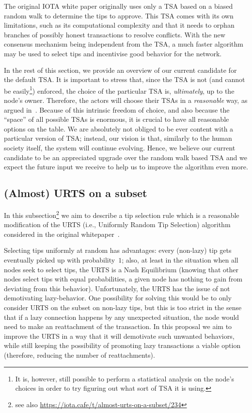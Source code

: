 \documentclass[../main.tex]{subfiles}
\begin{document}
The original IOTA white paper originally uses only a TSA based on a biased random walk to determine the tips to approve. This TSA comes with its own limitations, such as its computational complexity and that it needs to orphan branches of possibly honest transactions to resolve conflicts. With the new consensus mechanism being independent from the TSA, a much faster algorithm may be used to select tips and incentivise good behavior for the network. 


In the rest of this section, we provide an overview of our
current candidate for the default TSA.
It is important to stress that, since the TSA is not (and cannot 
be easily\footnote{It is, however, still possible to perform 
a statistical analysis on the node's choices in order to
try figuring out what sort of TSA it is using.}) 
enforced, the choice of the particular TSA 
is, \emph{ultimately}, 
up to the node's owner. Therefore, the actors 
will choose their TSAs in a \emph{reasonable} way, as argued in~\cite{popov2019feelessfree}. 
Because of this intrinsic freedom of choice, and also because the ``space'' of all possible TSAs is enormous, it is crucial to have all reasonable options on the table. We are absolutely not obliged to be ever content with a particular version of TSA; instead, our vision is that, similarly to the human society itself, the system will continue evolving. Hence, we believe our current candidate to be an appreciated upgrade over the random walk based TSA and we expect the future input we receive to help us to improve the algorithm even more.

\subsection{(Almost) URTS on a subset}\label{sec:tsa_urts}
In this subsection\footnote{see also
\url{https://iota.cafe/t/almost-urts-on-a-subset/234}}
we aim to describe a tip selection
rule which is a reasonable modification of the URTS
(i.e., Uniformly Random Tip Selection) algorithm
considered in the original whitepaper~\cite{popov2018}. 


Selecting tips uniformly at random has advantages:
every (non-lazy) tip gets eventually picked up with probability~$1$;
also, at least in the situation when all nodes seek to select tips,
the URTS is a Nash Equilibrium (knowing that other nodes select tips
with equal probabilities, a given node has nothing to gain from 
deviating from this behavior). Unfortunately, the URTS has the issue of not demotivating lazy-behavior. One possibility for solving this would be to only consider URTS on the subset on non-lazy tips, but this is too strict in the sense that if a lazy connection happens by any unexpected situation, the node would need to make an reattachment of the transaction. In this proposal we aim to improve the URTS in a way that it will demotivate such unwanted behaviors, while still keeping the possibility of promoting lazy transactions a viable option (therefore, reducing the number of reattachments). 
\end{document}
